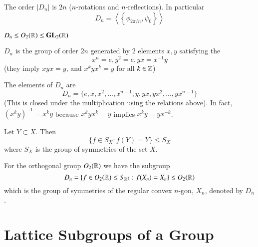 \begin{corollary}
    The order $|D_n|$ is $2n$ ($n$-rotations and $n$-reflections). In particular \begin{equation}
        D_n = \left\langle \left\{\phi_{2\pi/n},\psi_0\right\}\right\rangle
    \end{equation}
\end{corollary}

\begin{remark}
    $D_n \leq O_2(\mathbb R) \leq \mathbf{GL}_2(\mathbb R)$
\end{remark}

\begin{definition}
    $D_n$ is the group of order $2n$ generated by $2$ elements $x,y$ satisfying the  \begin{equation}
        x^n = e, y^2 = e, yx = x^{-1}y
    \end{equation}
    (they imply $xyx = y$, and $x^kyx^k = y$ for all $k \in \mathbb Z$)
\end{definition}

\begin{remark}
    The elements of $D_n$ are \begin{equation}
        D_n = \{e,x,x^2,...,x^{n-1},y,yx,yx^2,...,yx^{n-1}\}
    \end{equation}
    (This is closed under the multiplication using the relations above). In fact, $(x^ky)^{-1} = x^ky$ because $x^kyx^k = y$ implies $x^ky = yx^{-k}$.
\end{remark}

\begin{remark}
    Let $Y \subset X$. Then \begin{equation}
        \{f\in S_X:f(Y) = Y\} \leq S_X
    \end{equation}
    where $S_X$ is the group of symmetries of the set $X$.
\end{remark}


\begin{remark}
    For the orthogonal group $O_2(\mathbb R)$ we have the subgroup \begin{equation}
        D_n = \{f\in O_2(\mathbb R) \leq S_{\mathbb R^2}:f(X_n) = X_n\} \leq O_2(\mathbb R)
    \end{equation}
    which is the group of symmetries of the regular convex $n$-gon, $X_n$, denoted by $D_n$.
\end{remark}

\section{ Lattice Subgroups of a Group}

